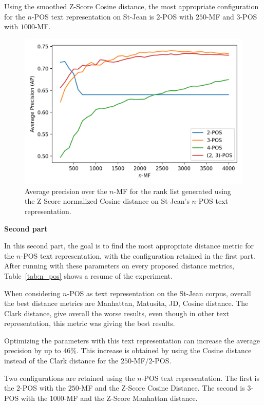 Using the smoothed Z-Score Cosine distance, the most appropriate configuration for the $n$-POS text representation on St-Jean is $2$-POS with $250$-MF and $3$-POS with $1000$-MF.

\begin{figure}
  \centering
  \caption{Average precision over the $n$-MF for the rank list generated using the Z-Score normalized Cosine distance on St-Jean's $n$-POS text representation.}
  \label{fig:n_pos}
  \includegraphics[width=\linewidth]{img/n_pos.png}
\end{figure}

\textbf{Second part}

In this second part, the goal is to find the most appropriate distance metric for the $n$-POS text representation, with the configuration retained in the first part.
After running with these parameters on every proposed distance metrics, Table~\ref{tab:n_pos} shows a resume of the experiment.

When considering $n$-POS as text representation on the St-Jean corpus, overall the best distance metrics are Manhattan, Matusita, JD, Cosine distance.
The Clark distance, give overall the worse results, even though in other text representation, this metric was giving the best results.

Optimizing the parameters with this text representation can increase the average precision by up to $46$\%.
This increase is obtained by using the Cosine distance instead of the Clark distance for the $250$-MF/$2$-POS.

Two configurations are retained using the $n$-POS text representation.
The first is the $2$-POS with the $250$-MF and the Z-Score Cosine Distance.
The second is $3$-POS with the $1000$-MF and the Z-Score Manhattan distance.

